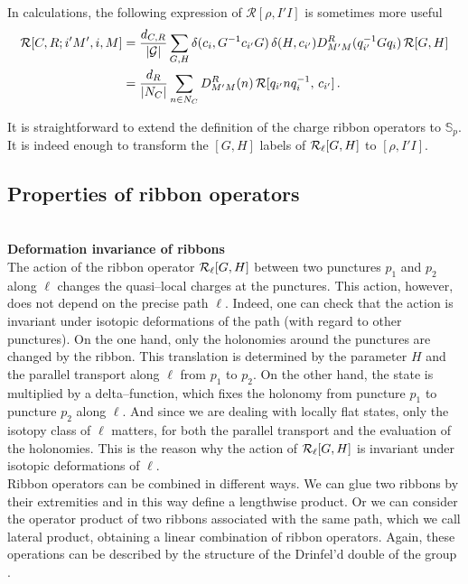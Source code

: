 \documentclass[nofootinbib,superscriptaddress,eqsecnum,tightenlines,11pt]{revtex4-1}
\def\nn{\nonumber}
\def\mG{\mathcal{G}}
\begin{document}
In calculations, the following expression of  $\mathcal{R}[\rho,I' I]$ is sometimes more useful
\begin{align}
	{\cal R}[C,R;i'M',i,M]&= \frac{{d_{C,R}}}{|\mG|} \sum_{G,H} \delta(c_i,G^{-1}c_{i'}G) \, \delta(H,c_{i'}) D^R_{M'M}(q_{i'}^{-1} Gq_i)\, {\cal R}[G,H] \nn\\
	&=\frac{d_R}{|N_C|} \sum_{n\in N_C} D^R_{M'M}(n) \, {\cal R}[q_{i'}nq_i^{-1},\,c_{i'}] \, .
\end{align}

It is straightforward to extend the definition of the charge ribbon operators to $\mathbb{S}_p$.
It is indeed enough to transform the $[G,H]$ labels of ${\cal R}_\ell[G,H]$ to $[\rho, I'I]$. 


\subsection{Properties of ribbon operators}

~\\
{\bf {Deformation invariance of ribbons}}\\
The action of the ribbon operator ${\cal R}_\ell[G,H]$ between two punctures $p_1$ and $p_2$ along $\ell$ changes the quasi--local charges at the punctures.
This action, however, does not depend on the precise path $\ell$.
Indeed, one can check that the action is invariant under isotopic deformations of the path (with regard to other punctures).
On the one hand, only the holonomies around the punctures are changed by the ribbon. 
This translation is determined by the parameter $H$ and the parallel transport along $\ell$ from $p_1$ to $p_2$.
On the other hand, the state is multiplied by a delta--function, which fixes the holonomy from puncture $p_1$ to puncture $p_2$  along $\ell$.  
And since we are dealing with locally flat states, only the isotopy class of $\ell$ matters, for both the parallel transport and the evaluation of the holonomies.
This is the reason why the action of ${\cal R}_\ell[G,H]$ is invariant under isotopic deformations of $\ell$. \\

Ribbon operators can be combined in different ways.
We can glue two ribbons by their extremities and in this way define a lengthwise product.
Or we can consider the operator product of two ribbons associated with the same path, which we call lateral product, obtaining a linear combination of ribbon operators.
Again, these operations can be described by the structure of the Drinfel'd double of the group \cite{Kitaev1}. \\
\end{document}
